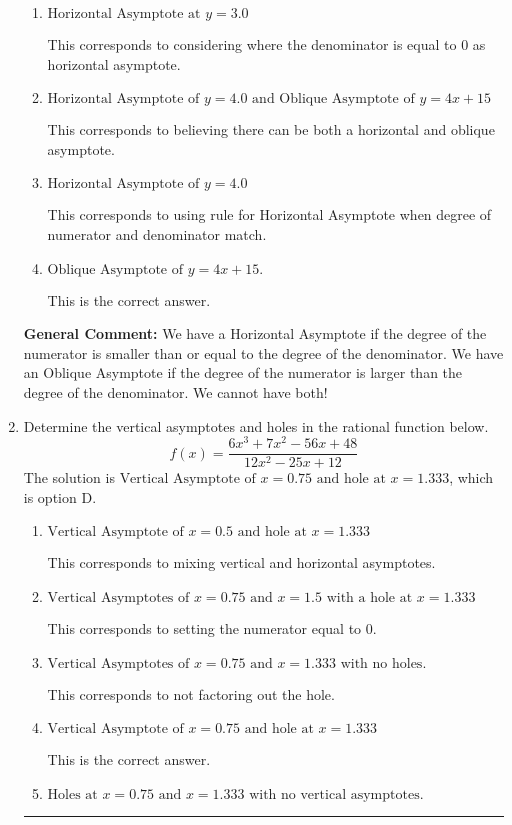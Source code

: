 \documentclass{extbook}[14pt]
\newcommand{\litem}[1]{\item #1

\rule{\textwidth}{0.4pt}}
\begin{document}
\begin{enumerate}
{\begin{enumerate}[label=\Alph*.]
This corresponds to believing there can be both a horizontal and oblique asymptote AND mixing up horizontal/vertical asymoptote.
\item \( \text{Horizontal Asymptote at } y = 3.0 \)

This corresponds to considering where the denominator is equal to 0 as horizontal asymptote.
\item \( \text{Horizontal Asymptote of } y = 4.0 \text{ and Oblique Asymptote of } y = 4x + 15 \)

This corresponds to believing there can be both a horizontal and oblique asymptote.
\item \( \text{Horizontal Asymptote of } y = 4.0  \)

This corresponds to using rule for Horizontal Asymptote when degree of numerator and denominator match.
\item \( \text{Oblique Asymptote of } y = 4x + 15. \)

This is the correct answer.
\end{enumerate}

\textbf{General Comment:} We have a Horizontal Asymptote if the degree of the numerator is smaller than or equal to the degree of the denominator. We have an Oblique Asymptote if the degree of the numerator is larger than the degree of the denominator. We cannot have both!
}
\litem{
Determine the vertical asymptotes and holes in the rational function below.
\[ f(x) = \frac{6x^{3} +7 x^{2} -56 x + 48}{12x^{2} -25 x + 12} \]The solution is \( \text{Vertical Asymptote of } x = 0.75 \text{ and hole at } x = 1.333 \), which is option D.\begin{enumerate}[label=\Alph*.]
\item \( \text{Vertical Asymptote of } x = 0.5 \text{ and hole at } x = 1.333 \)

This corresponds to mixing vertical and horizontal asymptotes.
\item \( \text{Vertical Asymptotes of } x = 0.75 \text{ and } x = 1.5 \text{ with a hole at } x = 1.333 \)

This corresponds to setting the numerator equal to 0.
\item \( \text{Vertical Asymptotes of } x = 0.75 \text{ and } x = 1.333 \text{ with no holes.} \)

This corresponds to not factoring out the hole.
\item \( \text{Vertical Asymptote of } x = 0.75 \text{ and hole at } x = 1.333 \)

This is the correct answer.
\item \( \text{Holes at } x = 0.75 \text{ and } x = 1.333 \text{ with no vertical asymptotes.} \)


\end{enumerate}}
\end{enumerate}
\end{document}
